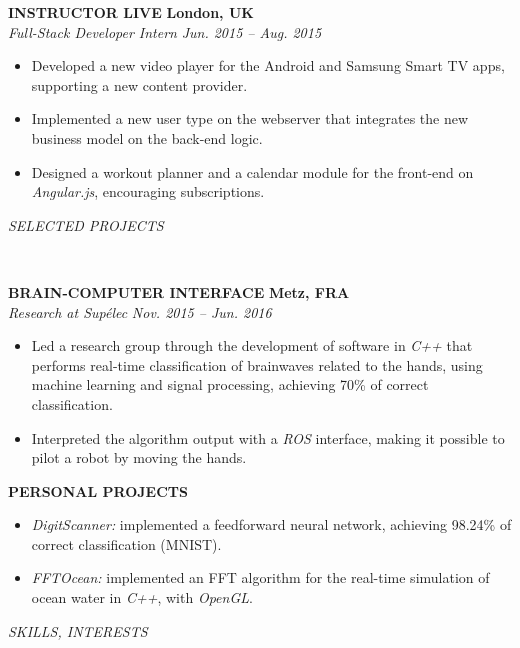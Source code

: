 \documentclass[a4paper, 12pt]{article}
\newcommand{\marginline}{-0.3cm}
\newcommand{\margincontent}{-0.6cm}
\newcommand{\marginbeforesection}{0.3cm}
\newcommand{\marginbeforemisc}{-0.75cm}
\newcommand{\linewidthperso}{0.02cm}
\newcommand{\stylesection}[1]{
  \vspace{\marginbeforesection}
  \begin{normalsize}\textit{#1}\end{normalsize}
  \vspace{\marginline}\\
  \noindent\makebox[\linewidth]{\rule{\textwidth}{\linewidthperso}}

}
\newcommand{\styletitle}[1]{\textbf{#1}}
\newcommand{\styledesc}[1]{\textit{#1}}
\newcommand{\styleloc}[1]{\textbf{#1}}
\newcommand{\styledates}[1]{\textit{#1}}
\begin{document}
\begin{footnotesize}
\styletitle{INSTRUCTOR LIVE} \hfill \styleloc{London, UK}\\
\styledesc{Full-Stack Developer Intern} \hfill \styledates{Jun. 2015 -- Aug. 2015}\\
\vspace{\margincontent}
\begin{itemize}
  \item Developed a new video player for the Android and Samsung Smart TV apps, supporting a new content provider.
  \item Implemented a new user type on the webserver that integrates the new business model on the back-end logic.
  \item Designed a workout planner and a calendar module for the front-end on \textit{Angular.js}, encouraging subscriptions.
\end{itemize}

\stylesection{SELECTED PROJECTS}
   
\styletitle{BRAIN-COMPUTER INTERFACE} \hfill \styleloc{Metz, FRA}\\
\styledesc{Research at Sup\'elec} \hfill \styledates{Nov. 2015 -- Jun. 2016}\\
\vspace{\margincontent}
\begin{itemize}
  \item Led a research group through the development of software in \textit{C++} that performs real-time classification of brainwaves related to the hands, using machine learning and signal processing, achieving 70\% of correct classification.
  \item Interpreted the algorithm output with a \textit{ROS} interface, making it possible to pilot a robot by moving the hands.
\end{itemize}

\styletitle{PERSONAL PROJECTS}\\
\vspace{\margincontent}
\begin{itemize}
  \item \textit{DigitScanner:} implemented a feedforward neural network, achieving 98.24\% of correct classification (MNIST).
  \item \textit{FFTOcean:} implemented an FFT algorithm for the real-time simulation of ocean water in \textit{C++}, with \textit{OpenGL}.
\end{itemize}

\stylesection{SKILLS, INTERESTS}
~\\
\vspace{\marginbeforemisc}


\end{footnotesize}
\end{document}
